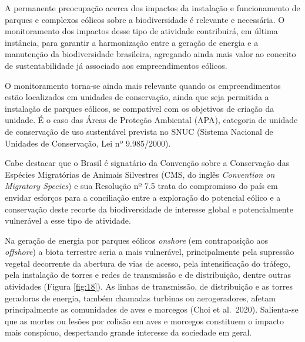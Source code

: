 \documentclass[
  oneside]{scrbook}
\begin{document}
A permanente preocupação acerca dos impactos da instalação e funcionamento de parques e complexos eólicos sobre a biodiversidade é relevante e necessária. O monitoramento dos impactos desse tipo de atividade contribuirá, em última instância, para garantir a harmonização entre a geração de energia e a manutenção da biodiversidade brasileira, agregando ainda mais valor ao conceito de sustentabilidade já associado aos empreendimentos eólicos.

O monitoramento torna-se ainda mais relevante quando os empreendimentos estão localizados em unidades de conservação, ainda que seja permitida a instalação de parques eólicos, se compatível com os objetivos de criação da unidade. É o caso das Áreas de Proteção Ambiental (APA), categoria de unidade de conservação de uso sustentável prevista no SNUC (Sistema Nacional de Unidades de Conservação, Lei nº 9.985/2000).

Cabe destacar que o Brasil é signatário da Convenção sobre a Conservação das Espécies Migratórias de Animais Silvestres (CMS, do inglês \emph{Convention on Migratory Species}) e sua Resolução nº 7.5 trata do compromisso do país em envidar esforços para a conciliação entre a exploração do potencial eólico e a conservação deste recorte da biodiversidade de interesse global e potencialmente vulnerável a esse tipo de atividade.

Na geração de energia por parques eólicos \emph{onshore} (em contraposição aos \emph{offshore}) a biota terrestre seria a mais vulnerável, principalmente pela supressão vegetal decorrente da abertura de vias de acesso, pela intensificação do tráfego, pela instalação de torres e redes de transmissão e de distribuição, dentre outras atividades (Figura \ref{fig:18}). As linhas de transmissão, de distribuição e as torres geradoras de energia, também chamadas turbinas ou aerogeradores, afetam principalmente as comunidades de aves e morcegos (Choi et al.~2020). Salienta-se que as mortes ou lesões por colisão em aves e morcegos constituem o impacto mais conspícuo, despertando grande interesse da sociedade em geral.
\end{document}
